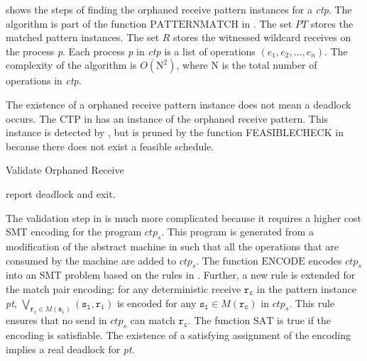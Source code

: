  shows the steps of finding the orphaned receive pattern instances for a \textit{ctp}. The algorithm is part of the function $\mathrm{PATTERNMATCH}$ in . 
The set $\mathit{PT}$ stores the matched pattern instances.
The set $\mathit{R}$ stores the witnessed wildcard receives on the process \textit{p}. 
Each process \textit{p} in \textit{ctp} is a list of operations $(e_1, e_2, \dots, e_n)$. 
The complexity of the algorithm is $O(\mathrm{N}^2)$, where $\mathrm{N}$ is the total number of operations in \textit{ctp}. 



\examplefigtwo

The existence of a orphaned receive pattern instance does not mean a deadlock occurs. The CTP in  has an instance of the orphaned receive pattern. This instance is detected by , but is pruned by the function \textrm{FEASIBLECHECK} in  because there does not exist a feasible schedule.

\begin{algorithm}
\caption{Validate Orphaned Receive}\label{algo:vorphaned}
\begin{algorithmic}[1]
\State report deadlock and exit.
\EndIf
\end{algorithmic}
\end{algorithm}

The validation step in  is much more complicated because it requires a higher cost SMT encoding for the program $\mathit{ctp_s}$. 
This program is generated from a modification of the abstract machine in  such that all the operations that are consumed by the machine are added to $\mathit{ctp_s}$.
The function $\mathrm{ENCODE}$ encodes $\mathit{ctp_s}$ into an SMT problem based on the rules in \cite{DBLP:conf/kbse/HuangMM13}. Further, a new rule is extended for the match pair encoding: for any deterministic receive $\mathtt{r_c}$ in the pattern instance \textit{pt}, $\bigvee_{\mathtt{r_i}\in\mathit{M}(\mathtt{s_l})}(\mathtt{s_l},\mathtt{r_i})$ is encoded for any $\mathtt{s_l}\in\mathit{M}(\mathtt{r_c})$ in $\mathit{ctp_s}$. This rule ensures that no send in $\mathit{ctp_s}$ can match $\mathtt{r_c}$. The function $\mathrm{SAT}$ is true if the encoding is satisfiable. The existence of a satisfying assignment of the encoding implies a real deadlock for \textit{pt}. 


